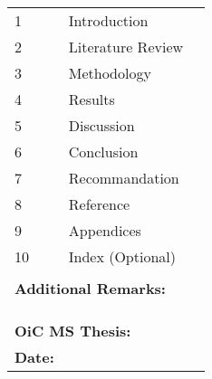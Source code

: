 \begin{table}[]
\begin{tabular}{lll}
1              & Introduction                                                                                                    &  \\
2              & Literature Review                                                                                               &  \\
3              & Methodology                                                                                                     &  \\
4              & Results                                                                                                         &  \\
5              & Discussion                                                                                                      &  \\
6              & Conclusion                                                                                                      &  \\
7              & Recommandation                                                                                                  &  \\
8              & Reference                                                                                                       &  \\
9              & Appendices                                                                                                      &  \\
10             & Index (Optional)                                                                                                &  \\
               &                                                                                                                 &  \\
\multicolumn{2}{l}{\textbf{Additional Remarks:}}                                                                                 &  \\ \cline{1-2}
\multicolumn{2}{|l|}{}                                                                                                           &  \\ \cline{1-2}
\multicolumn{2}{|l|}{}                                                                                                           &  \\ \cline{1-2}
\multicolumn{2}{|l|}{}                                                                                                           &  \\ \cline{1-2}
\multicolumn{2}{l}{\textbf{OiC   MS Thesis:}}                                                                                    &  \\
\textbf{Date:} &                                                                                                                 & 
\end{tabular}
\end{table}